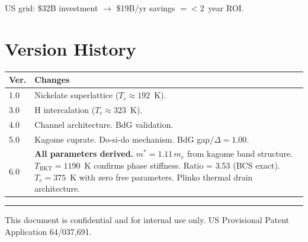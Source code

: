 \documentclass[11pt, a4paper]{article}
\begin{document}
US grid: \$32B investment $\to$ \$19B/yr savings $= < 2$~year ROI.

\section{Version History}

\begin{center}
\begin{tabular}{@{}lp{9cm}@{}}
\toprule
\textbf{Ver.} & \textbf{Changes} \\
\midrule
1.0 & Nickelate superlattice ($T_c \approx 192$~K). \\
3.0 & H intercalation ($T_c \approx 323$~K). \\
4.0 & Channel architecture. BdG validation. \\
5.0 & Kagome cuprate. Do-si-do mechanism. BdG gap$/\Delta = 1.00$. \\
6.0 & \textbf{All parameters derived.} $m^* = 1.11\,m_e$ from kagome
      band structure. $T_{\text{BKT}} = 1190$~K confirms phase
      stiffness. Ratio = 3.53 (BCS exact). $T_c = 375$~K with zero
      free parameters. Plinko thermal drain architecture. \\
\bottomrule
\end{tabular}
\end{center}

\vspace{2em}\hrule\vspace{0.5em}
{\color{nm-gray}\small This document is confidential and for
internal use only. US Provisional Patent Application 64/037,691.}
\end{document}
